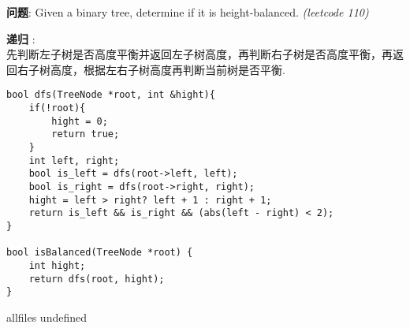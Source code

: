 \documentclass{article}
\begin{document}
\begin{CJK}{UTF8}{gbsn}     %

\else
    
\begin{description}
    \item{\textbf{问题}}: Given a binary tree, determine if it is height-balanced. \textit{(leetcode 110)}
    \item{\textbf{递归}} : 
    \\先判断左子树是否高度平衡并返回左子树高度，再判断右子树是否高度平衡，再返回右子树高度，根据左右子树高度再判断当前树是否平衡.
    \begin{lstlisting}
bool dfs(TreeNode *root, int &hight){
    if(!root){
        hight = 0;
        return true;
    }
    int left, right;
    bool is_left = dfs(root->left, left);
    bool is_right = dfs(root->right, right);
    hight = left > right? left + 1 : right + 1;
    return is_left && is_right && (abs(left - right) < 2);
}

bool isBalanced(TreeNode *root) {
    int hight;
    return dfs(root, hight);
}
    \end{lstlisting}
\end{description}

\fi

\ifx allfiles undefined
\end{CJK}
\end{document}
